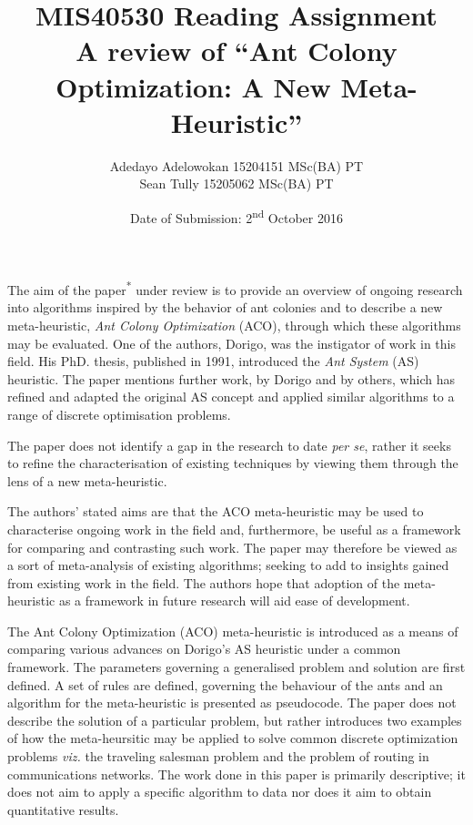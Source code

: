\documentclass[a4paper,10pt]{report}
\begin{document}

\title{MIS40530 Reading Assignment
\\A review of ``Ant Colony Optimization: A New Meta-Heuristic''}
\author{Adedayo Adelowokan 15204151 MSc(BA) PT\\ Sean Tully 15205062 MSc(BA) PT}
\date{Date of Submission: 2\textsuperscript{nd} October 2016}
\maketitle
The aim of the paper\textsuperscript{*} under review is to provide an overview of ongoing research into algorithms inspired by the behavior of ant colonies and to describe a new meta-heuristic, \emph{Ant Colony Optimization} (ACO), through which these algorithms may be evaluated.  One of the authors, Dorigo, was the instigator of work in this field.  His PhD. thesis, published in 1991, introduced the \emph{Ant System} (AS) heuristic. The paper mentions further work, by Dorigo and by others, which has refined and adapted the original AS concept and applied similar algorithms to a range of discrete optimisation problems.  

The paper does not identify a gap in the research to date \emph{per se}, rather it seeks to refine the characterisation of existing techniques by viewing them through the lens of a new meta-heuristic.

The authors' stated aims are that the ACO meta-heuristic may be used to characterise ongoing work in the field and, furthermore, be useful as a framework for comparing and contrasting such work.  The paper may therefore be viewed as a sort of meta-analysis of existing algorithms; seeking to add to insights gained from existing work in the field.  The authors hope that adoption of the meta-heuristic as a framework in future research will aid ease of development.

The Ant Colony Optimization (ACO) meta-heuristic is introduced as a means of comparing various advances on Dorigo's AS heuristic under a common framework.  The parameters governing a generalised problem and solution are first defined.  A set of rules are defined, governing the behaviour of the ants and an algorithm for the meta-heuristic is presented as pseudocode.  The paper does not describe the solution of a particular problem, but rather introduces two examples of how the meta-heursitic may be applied to solve common discrete optimization problems \emph{viz.} the traveling salesman problem and the problem of routing in communications networks.  The work done in this paper is primarily descriptive; it does not aim to apply a specific algorithm to data nor does it aim to obtain quantitative results.
 
\end{document}
